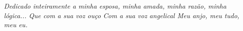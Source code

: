 \textit{Dedicado inteiramente a minha esposa, minha amada, minha razão, minha lógica... Que com a sua voz ouço  Com a sua voz angelical Meu anjo, meu tudo, meu eu.}
